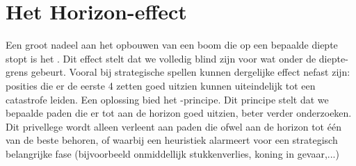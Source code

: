 \section{Het Horizon-effect} 
Een groot nadeel aan het opbouwen van een boom die op een bepaalde diepte stopt is het . Dit effect stelt dat we volledig blind zijn voor wat onder de diepte-grens gebeurt. Vooral bij strategische spellen kunnen dergelijke effect nefast zijn: posities die er de eerste 4 zetten goed uitzien kunnen uiteindelijk tot een catastrofe leiden. Een oplossing bied het -principe. Dit principe stelt dat we bepaalde paden die er tot aan de horizon goed uitzien, beter verder onderzoeken. Dit privellege wordt alleen verleent aan paden die ofwel aan de horizon tot \'e\'en van de beste behoren, of waarbij een heuristiek alarmeert voor een strategisch belangrijke fase (bijvoorbeeld onmiddellijk stukkenverlies, koning in gevaar,...)
